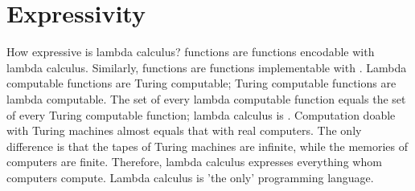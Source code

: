 \section{Expressivity}

How expressive is lambda calculus?  functions are
functions encodable with lambda calculus. Similarly, 
functions are functions implementable with . Lambda
computable functions are Turing computable; Turing computable functions are
lambda computable. The set of every lambda computable function equals the set of
every Turing computable function; lambda calculus is .
Computation doable with Turing machines almost equals that with real computers.
The only difference is that the tapes of Turing machines are infinite, while the
memories of computers are finite. Therefore, lambda calculus expresses everything
whom computers compute. Lambda calculus is 'the only' programming language.
